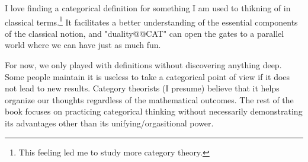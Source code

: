 \documentclass[main.tex]{subfiles}
\begin{document}
I love finding a categorical definition for something I am used to thikning of in classical terms.\footnote{This feeling led me to study more category theory.} It facilitates a better understanding of the essential components of the classical notion, and "duality@@CAT" can open the gates to a parallel world where we can have just as much fun.

For now, we only played with definitions without discovering anything deep. Some people maintain it is useless to take a categorical point of view if it does not lead to new results. Category theorists (I presume) believe that it helps organize our thoughts regardless of the mathematical outcomes. The rest of the book focuses on practicing categorical thinking without necessarily demonstrating its advantages other than its unifying/orgasitional power.
\end{document}
